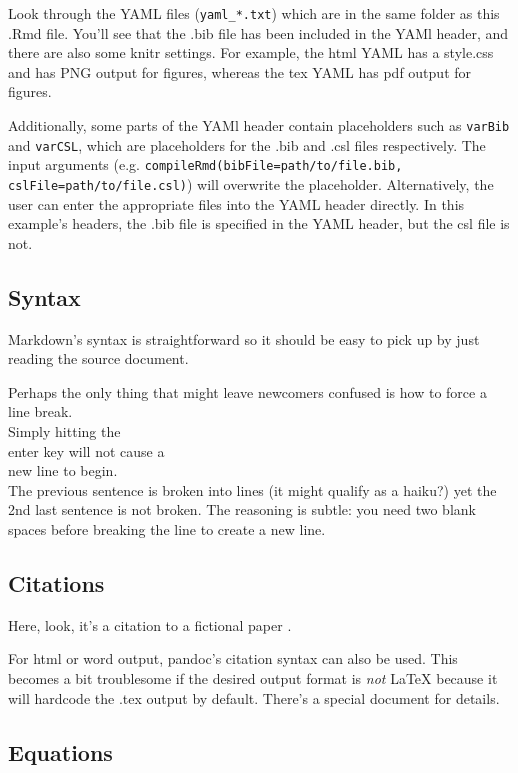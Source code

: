 \documentclass[]{article}
\begin{document}
Look through the YAML files (\texttt{yaml\_*.txt}) which are in the same
folder as this .Rmd file. You'll see that the .bib file has been
included in the YAMl header, and there are also some knitr settings. For
example, the html YAML has a style.css and has PNG output for figures,
whereas the tex YAML has pdf output for figures.

Additionally, some parts of the YAMl header contain placeholders such as
\texttt{varBib} and \texttt{varCSL}, which are placeholders for the .bib
and .csl files respectively. The input arguments (e.g.
\texttt{compileRmd(bibFile=\textquotesingle{}path/to/file.bib\textquotesingle{}, cslFile=\textquotesingle{}path/to/file.csl\textquotesingle{})})
will overwrite the placeholder. Alternatively, the user can enter the
appropriate files into the YAML header directly. In this example's
headers, the .bib file is specified in the YAML header, but the csl file
is not.

\subsection{Syntax}\label{syntax}

Markdown's syntax is straightforward so it should be easy to pick up by
just reading the source document.

Perhaps the only thing that might leave newcomers confused is how to
force a line break.\\Simply hitting the\\enter key will not cause a\\new
line to begin.\\The previous sentence is broken into lines (it might
qualify as a haiku?) yet the 2nd last sentence is not broken. The
reasoning is subtle: you need two blank spaces before breaking the line
to create a new line.

\subsection{Citations}\label{citations}

Here, look, it's a citation to a fictional paper \cite{Rosencrantz}.

For html or word output, pandoc's citation syntax can also be used. This
becomes a bit troublesome if the desired output format is \emph{not}
LaTeX because it will hardcode the .tex output by default. There's a
special document for details.

\subsection{Equations}\label{equations}
\end{document}

